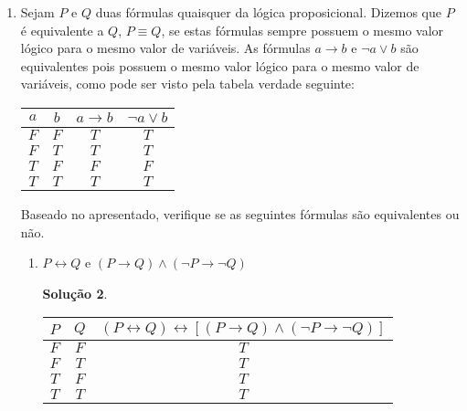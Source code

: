 \documentclass[11pt,a4paper]{report}
\newtheorem*{Solucao}{Solu\c{c}\~ao}
\newcommand{\F}{$F$}
\newcommand{\T}{$T$}
\begin{document}
\begin{enumerate}
\begin{enumerate}
\begin{Solucao}
                      contingente.
                  \end{Solucao}
	\end{enumerate}
	\item Sejam $P$ e $Q$ duas f\'ormulas quaisquer da l\'ogica proposicional. Dizemos que $P$ \'e equivalente a $Q$, 
	      $P\equiv Q$, se estas f\'ormulas sempre possuem o mesmo valor l\'ogico para o mesmo valor de vari\'aveis. As
	      f\'ormulas $a\rightarrow b$ e $\neg a\lor b$ s\~ao equivalentes pois possuem o mesmo valor l\'ogico para o
	      mesmo valor de vari\'aveis, como pode ser visto pela tabela verdade seguinte:
	      \begin{center}
	      \begin{tabular}{|c|c|c|c|}
	      	\hline
	      	$a$ & $b$ & $a\rightarrow b$ & $\neg a\lor b$ \\
	      	\hline
	      	$F$ & $F$ &     $T$          &       $T$\\
	      	$F$ & $T$ &     $T$          &       $T$\\
	      	$T$ & $F$ &     $F$          &       $F$\\
	      	$T$ & $T$ &     $T$          &       $T$\\
	      	\hline
	      \end{tabular}
	      \end{center}
              Baseado no apresentado, verifique se as seguintes f\'ormulas
              s\~ao equivalentes ou n\~ao.
	\begin{enumerate}
		\item $P\leftrightarrow Q$ e $(P\rightarrow
                  Q)\land(\neg P\rightarrow \neg Q)$
                  \begin{Solucao}
                    \verb| |\\
                    \begin{tabular}{|c|c|c|}
                      \hline
                      $P$ & $Q$ & $(P\leftrightarrow
                      Q)\leftrightarrow[(P \to Q) \land (\neg P \to
                      \neg Q)]$ \\ \hline
                      \F & \F & \T \\
                      \F & \T & \T \\
                      \T & \F & \T \\
                      \T & \T & \T \\ \hline
                    \end{tabular}


\end{Solucao}
\end{enumerate}
\end{enumerate}
\end{document}
